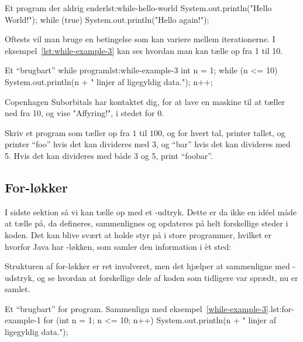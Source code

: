 		\begin{JavaCode}{Et program der aldrig ender}{lst:while-hello-world}
			System.out.println("Hello World!");
			while (true) {
				System.out.println("Hello again!");
			}
		\end{JavaCode}

		 Oftests vil man bruge
		en betingelse som kan variere mellem iterationerne. I
		eksempel~\ref{lst:while-example-3} kan ses hvordan man kan tælle op fra
		1 til 10.

		\begin{JavaCode}{Et ``brugbart'' while program}{lst:while-example-3}
			int n = 1;
			while (n <= 10) {
				System.out.println(n + " linjer af ligegyldig data.");
				n++;
			}
		\end{JavaCode}

		\begin{exercise}
			Copenhagen Suborbitals har kontaktet dig, for at lave en maskine til
			at tæller ned fra 10, og vise "Affyring!", i stedet for 0.
		\end{exercise}

		\begin{exercise}
			Skriv et program som tæller op fra \(1\) til \(100\), og for hvert
			tal, printer tallet, og printer ``foo'' hvis det kan divideres med 3,
			og ``bar'' hvis det kan divideres med 5. Hvis det kan divideres med
			både 3 og 5, print ``foobar''.
		\end{exercise}

	\subsection{For-løkker}

		I sidste sektion så vi kan tælle op med et -udtryk.
		Dette er da ikke en idéel måde at tælle på, da 
		defineres, sammenlignes og opdateres på helt forskellige steder i koden.
		Det kan blive svært at holde styr på i store programmer, hvilket er
		hvorfor Java har -løkken, som samler den information i
		èt sted: 


		Strukturen af for-løkker er ret involveret, men det hjælper at
		sammenligne med -udstryk, og se hvordan at forskellige
		dele af koden som tidligere var sprædt, nu er samlet.

		\begin{JavaCode}{Et ``brugbart'' for program. Sammenlign med eksempel~\ref{while-example-3}.}{lst:for-example-1}
			for (int n = 1; n <= 10; n++) {
				System.out.println(n + " linjer af ligegyldig data.");
			}
		\end{JavaCode}

